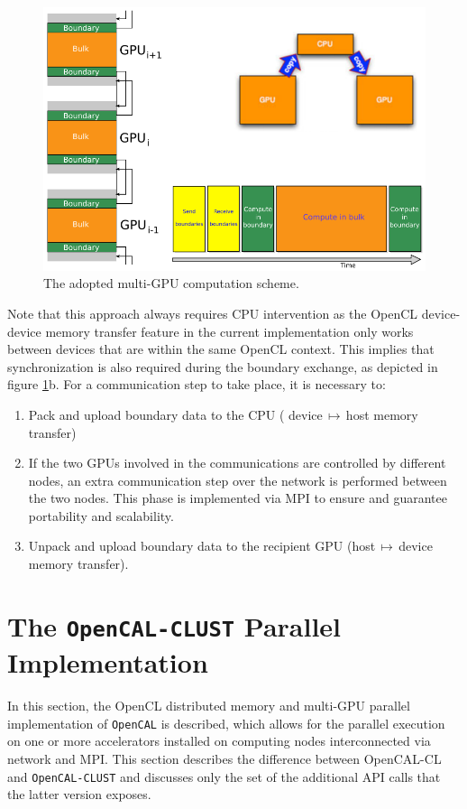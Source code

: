 \begin{figure}
    \centering
        \includegraphics[width=1.0\textwidth]{./images/opencal/multigpu_naive_exchange.png}
        \caption{The adopted multi-GPU computation scheme.}
        \label{fig:multigpu_naive_exchange}
\end{figure}


Note that this approach always requires CPU intervention as the OpenCL device-device memory transfer feature in the current implementation only works between devices that are within the same OpenCL context. This implies that synchronization is also required during the boundary exchange, as depicted in figure \ref{fig:multigpu_naive_exchange}b.
For a communication step to take place, it is necessary to:
\begin{enumerate}
    \item Pack and upload boundary data to the CPU ( device$\,\mapsto\,$host  memory transfer)
    \item If the two GPUs involved in the communications are controlled by different nodes, an extra communication step over the network is performed between the two nodes. This phase is implemented via MPI \cite{Forum:1994:MMI:898758} to ensure and guarantee portability and scalability. 
    \item Unpack and upload boundary data to the recipient GPU (host$\,\mapsto\,$device memory transfer).
\end{enumerate}


\section{The \texttt{OpenCAL-CLUST}  Parallel Implementation}
\label{sec:opencal_cluster_implementation}
  In this section, the OpenCL distributed memory and multi-GPU parallel implementation of \texttt{OpenCAL} is described, which allows for the parallel execution on one or more accelerators installed on computing nodes interconnected via network and MPI.
This section describes the difference between OpenCAL-CL and \texttt{OpenCAL-CLUST}  and discusses only the set of the additional API calls that the latter version exposes. 

